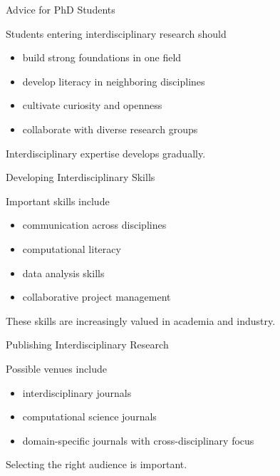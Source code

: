 \documentclass{beamer}
\begin{document}

\begin{frame}{Advice for PhD Students}

Students entering interdisciplinary research should

\begin{itemize}
\item build strong foundations in one field
\item develop literacy in neighboring disciplines
\item cultivate curiosity and openness
\item collaborate with diverse research groups
\end{itemize}

Interdisciplinary expertise develops gradually.

\end{frame}


\begin{frame}{Developing Interdisciplinary Skills}

Important skills include

\begin{itemize}
\item communication across disciplines
\item computational literacy
\item data analysis skills
\item collaborative project management
\end{itemize}

These skills are increasingly valued in academia
and industry.

\end{frame}


\begin{frame}{Publishing Interdisciplinary Research}

Possible venues include

\begin{itemize}
\item interdisciplinary journals
\item computational science journals
\item domain-specific journals with cross-disciplinary focus
\end{itemize}

Selecting the right audience is important.

\end{frame}
\end{document}
